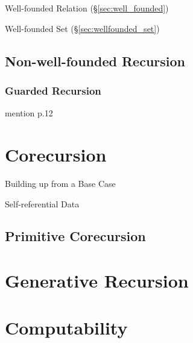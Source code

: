 Well-founded Relation (\S\ref{sec:well_founded})

Well-founded Set (\S\ref{sec:wellfounded_set})



\subsection{Non-well-founded Recursion}
\label{sec:nonwellfounded_recursion}

\subsubsection{Guarded Recursion}\label{sec:guarded_recursion}

mention \cite{abramsky-gay-nagarajan96} p.12



\section{Corecursion}\label{sec:corecursion}

Building up from a Base Case

Self-referential Data



\subsection{Primitive Corecursion}\label{sec:primitive_corecursion}



\section{Generative Recursion}\label{sec:generative_recursion}

\section{Computability}\label{sec:computability}

